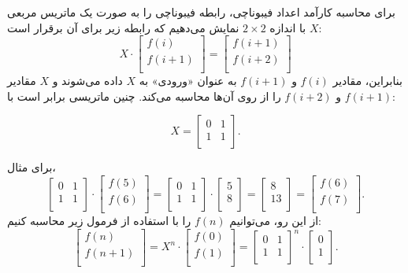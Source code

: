 \begin{samepage}
برای محاسبه کارآمد اعداد فیبوناچی،
رابطه فیبوناچی را به صورت یک ماتریس مربعی $X$ با اندازه $2 \times 2$
نمایش می‌دهیم که رابطه زیر برای آن برقرار است:
\[ X \cdot
 \begin{bmatrix}
  f(i) \\
  f(i+1) \\
 \end{bmatrix}
=
 \begin{bmatrix}
  f(i+1) \\
  f(i+2) \\
 \end{bmatrix}
 \]
بنابراین، مقادیر $f(i)$ و $f(i+1)$ به عنوان «ورودی» به $X$ داده می‌شوند
و $X$ مقادیر $f(i+1)$ و $f(i+2)$ را از روی آن‌ها محاسبه می‌کند.
چنین ماتریسی برابر است با:

\[ X = 
 \begin{bmatrix}
  0 & 1 \\
  1 & 1 \\
 \end{bmatrix}.
\]
\end{samepage}
\noindent
برای مثال،
\[
 \begin{bmatrix}
  0 & 1 \\
  1 & 1 \\
 \end{bmatrix}
\cdot
 \begin{bmatrix}
  f(5) \\
  f(6) \\
 \end{bmatrix}
=
 \begin{bmatrix}
  0 & 1 \\
  1 & 1 \\
 \end{bmatrix}
\cdot
 \begin{bmatrix}
  5 \\
  8 \\
 \end{bmatrix}
=
 \begin{bmatrix}
  8 \\
  13 \\
 \end{bmatrix}
=
 \begin{bmatrix}
  f(6) \\
  f(7) \\
 \end{bmatrix}.
\]
از این رو، می‌توانیم $f(n)$ را با استفاده از فرمول زیر محاسبه کنیم:
\[
 \begin{bmatrix}
  f(n) \\
  f(n+1) \\
 \end{bmatrix}
=
X^n \cdot
 \begin{bmatrix}
  f(0) \\
  f(1) \\
 \end{bmatrix}
=
 \begin{bmatrix}
  0 & 1 \\
  1 & 1 \\
 \end{bmatrix}^n
\cdot
 \begin{bmatrix}
  0 \\
  1 \\
 \end{bmatrix}.
\]
